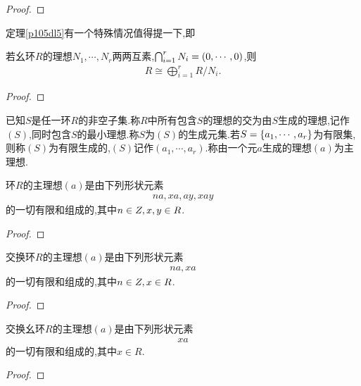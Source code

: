 \begin{proof}
    \stars
\end{proof}
定理\ref{p105dl5}有一个特殊情况值得提一下,即
\begin{theorem}\label{p107dl5'}
    若幺环$R$的理想$N_1,\cdots,N_r$两两互素,$\bigcap_{i=1}^{r}N_i=\left(0,\cdots,0\right)$,则\begin{align*}
        R\cong\bigoplus_{i=1}^{r}R/N_i.
    \end{align*}
\end{theorem}
\begin{proof}
    \stars
\end{proof}
\begin{example}
    \stars
\end{example}
\begin{definition}\label{ysuidlx}\label{uiyj}\label{yxuid}\label{vlx}
    已知$S$是任一环$R$的非空子集.称$R$中所有包含$S$的理想的交为由$S$生成的理想,记作$(S)$,同时包含$S$的最小理想.称$S$为$(S)$的生成元集.若$S=\left\{a_1,\cdots,a_r\right\}$为有限集,则称$(S)$为有限生成的,$(S)$记作$(a_1,\cdots,a_r)$.称由一个元$a$生成的理想$(a)$为主理想.
\end{definition}
\begin{proposition}
    环$R$的主理想$(a)$是由下列形状元素\begin{align*}
        na,xa,ay,xay
    \end{align*}的一切有限和组成的,其中$n\in\relax{Z},x,y\in R$.
\end{proposition}
\begin{proof}
    \stars
\end{proof}
\begin{proposition}
    交换环$R$的主理想$(a)$是由下列形状元素\begin{align*}
        na,xa
    \end{align*}的一切有限和组成的,其中$n\in\relax{Z},x\in R$.
\end{proposition}
\begin{proof}
    \stars
\end{proof}
\begin{proposition}
    交换幺环$R$的主理想$(a)$是由下列形状元素\begin{align*}
        xa
    \end{align*}的一切有限和组成的,其中$x\in R$.
\end{proposition}
\begin{proof}
    \stars
\end{proof}
